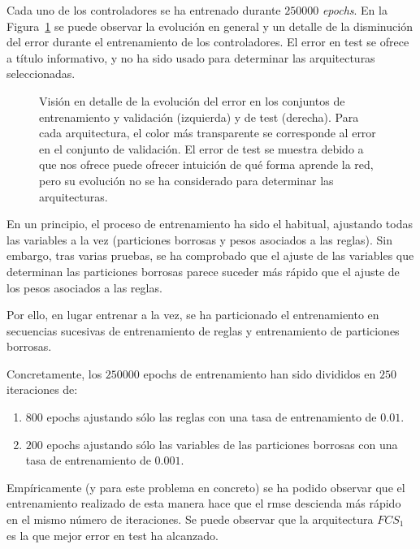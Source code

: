 Cada uno de los controladores se ha entrenado durante $250000$ \textit{epochs}. En la Figura~\ref{fig:lm-fcs-rmse-all-comparisons} se puede observar la evolución en general y un detalle de la disminución del error durante el entrenamiento de los controladores. El error en test se ofrece a título informativo, y no ha sido usado para determinar las arquitecturas seleccionadas.

\begin{figure}
	\centering
	\qquad
	\caption[Evolución del error durante el entrenamiento en las arquitecturas de \acrshort{fcs} para el modelo longitudinal]{Visión en detalle de la evolución del error en los conjuntos de entrenamiento y validación (izquierda) y de test (derecha). Para cada arquitectura, el color más transparente se corresponde al error en el conjunto de validación. El error de test se muestra debido a que nos ofrece puede ofrecer intuición de qué forma aprende la red, pero su evolución no se ha considerado para determinar las arquitecturas.}
	\label{fig:lm-fcs-rmse-all-comparisons}
\end{figure}

En un principio, el proceso de entrenamiento ha sido el habitual, ajustando todas las variables a la vez (particiones borrosas y pesos asociados a las reglas). Sin embargo, tras varias pruebas, se ha comprobado que el ajuste de las variables que determinan las particiones borrosas parece suceder más rápido que el ajuste de los pesos asociados a las reglas.

Por ello, en lugar entrenar a la vez, se ha particionado el entrenamiento en secuencias sucesivas de entrenamiento de reglas y entrenamiento de particiones borrosas.

Concretamente, los $250000$ epochs de entrenamiento han sido divididos en $250$ iteraciones de:

\begin{enumerate}
	\item $800$ epochs ajustando sólo las reglas con una tasa de entrenamiento de $0.01$.
	\item $200$ epochs ajustando sólo las variables de las particiones borrosas con una tasa de entrenamiento de $0.001$.
\end{enumerate}

Empíricamente (y para este problema en concreto) se ha podido observar que el entrenamiento realizado de esta manera hace que el \ac{rmse} descienda más rápido en el mismo número de iteraciones. Se puede observar que la arquitectura $FCS_1$ es la que mejor error en test ha alcanzado.

